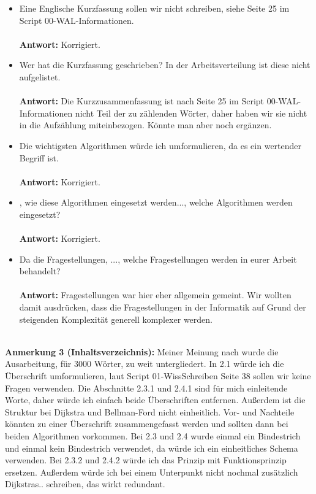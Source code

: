 \documentclass[a4paper,12pt]{book}
\begin{document}
\begin{itemize}
	\item Eine Englische Kurzfassung sollen wir nicht schreiben, siehe Seite 25 im Script 00-WAL-Informationen. 
	\\ \\
	\textbf{Antwort:}
	Korrigiert.
	
	\item Wer hat die Kurzfassung geschrieben? In der Arbeitsverteilung ist diese nicht aufgelistet.
	\\ \\
	\textbf{Antwort:}
	Die Kurzzusammenfassung ist nach Seite 25 im Script 00-WAL-Informationen nicht Teil der zu zählenden Wörter, daher haben wir sie nicht in die Aufzählung miteinbezogen. Könnte man aber noch ergänzen.
	
	\item Die \glqq wichtigsten\grqq{} Algorithmen würde ich umformulieren, da es ein wertender Begriff ist.
	\\ \\
	\textbf{Antwort:}
	Korrigiert.
	
	\item \glqq, wie diese Algorithmen eingesetzt werden...\grqq, welche Algorithmen werden eingesetzt?
	\\ \\
	\textbf{Antwort:}
	Korrigiert.
	
	\item \glqq Da die Fragestellungen, ...\grqq, welche Fragestellungen werden in eurer Arbeit behandelt? 
	\\ \\
	\textbf{Antwort:}
	Fragestellungen war hier eher allgemein gemeint. Wir wollten damit ausdrücken, dass die Fragestellungen in der Informatik auf Grund der steigenden Komplexität generell komplexer werden.
	
\end{itemize}
\leavevmode \\
\textbf{Anmerkung 3 (Inhaltsverzeichnis):}
Meiner Meinung nach wurde die Ausarbeitung, für 3000 Wörter, zu weit untergliedert. 
In 2.1 würde ich die Überschrift umformulieren, laut Script 01-WissSchreiben Seite 38 sollen wir keine Fragen verwenden.
Die Abschnitte 2.3.1 und 2.4.1 sind für mich einleitende Worte, daher würde ich einfach beide Überschriften entfernen. Außerdem ist die Struktur bei Dijkstra und Bellman-Ford nicht einheitlich. Vor- und Nachteile könnten zu einer Überschrift zusammengefasst werden und sollten dann bei beiden Algorithmen vorkommen. Bei 2.3 und 2.4 wurde einmal ein Bindestrich und einmal kein Bindestrich verwendet, da würde ich ein einheitliches Schema verwenden. Bei 2.3.2 und 2.4.2 würde ich das Prinzip mit Funktionsprinzip ersetzen. Außerdem würde ich bei einem Unterpunkt nicht nochmal zusätzlich Dijkstras.. schreiben, das wirkt redundant.  
\end{document}
